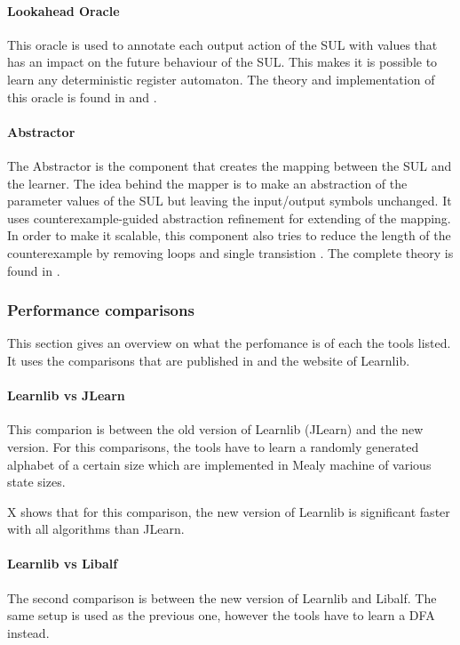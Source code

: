 \documentclass[multi,crop=false,class=article]{standalone}
\begin{document}
\paragraph{Lookahead Oracle}
This oracle is used to annotate each output action of the SUL with values that 
has an impact on the future behaviour of the SUL. This makes it is possible to 
learn any deterministic register automaton. The theory and implementation of 
this oracle is found in \cite{Aarts2014} and \cite{tomte14}.

\paragraph{Abstractor}
The Abstractor is the component that creates the mapping between the SUL and 
the learner. The idea behind the mapper is to make an abstraction of the 
parameter values of the SUL but leaving the input/output symbols unchanged. It 
uses counterexample-guided abstraction refinement\cite{tomte14} for extending 
of the mapping. In order to make it scalable, this component also tries to 
reduce the length of the counterexample by removing loops and single 
transistion \cite{Koopman2014}. The complete theory is found in \cite{tomte14}.

\subsubsection{Performance comparisons}
This section gives an overview on what the perfomance is of each the tools 
listed. It uses the comparisons that are published in 
\cite{Aarts2014}\cite{Aarts2015} and 
the website of 
Learnlib.

\paragraph{Learnlib vs JLearn}

\todo{Image of comparison between Learnlib and JLearn] } 
This comparion is between the old version of Learnlib (JLearn) and the new 
version. For this comparisons, the tools have to learn a randomly generated 
alphabet of a certain size which are implemented in Mealy machine of various 
state sizes.

X shows that for this comparison, the new version of Learnlib is 
significant faster with all algorithms than JLearn.

\paragraph{Learnlib vs Libalf}
The second comparison is between the new version of Learnlib and Libalf.
The same setup is used as the previous one, however the tools have to learn a 
DFA instead.
\end{document}
